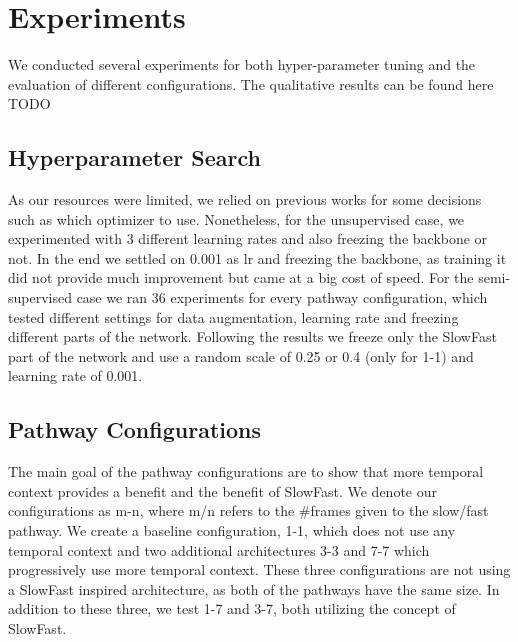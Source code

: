 \section{Experiments}
We conducted several experiments for both hyper-parameter tuning and the evaluation of different configurations.
The qualitative results can be found here TODO

\subsection{Hyperparameter Search}
As our resources were limited, we relied on previous works for some decisions such as which optimizer to use. Nonetheless, for the unsupervised case, we experimented with 3 different learning rates and also freezing the backbone or not. In the end we settled on 0.001 as lr and freezing the backbone, as training it did not provide much improvement but came at a big cost of speed. For the semi-supervised case we ran 36 experiments for every pathway configuration, which tested different settings for data augmentation, learning rate and freezing different parts of the network. Following the results we freeze only the SlowFast part of the network and use a random scale of 0.25 or 0.4 (only for 1-1) and learning rate of 0.001.

\subsection{Pathway Configurations}
The main goal of the pathway configurations are to show that more temporal context provides a benefit and the benefit of SlowFast. We denote our configurations as m-n, where m/n refers to the \#frames given to the slow/fast pathway.
We create a baseline configuration, 1-1, which does not use any temporal context and two additional architectures 3-3 and 7-7 which progressively use more temporal context. These three configurations are not using a SlowFast inspired architecture, as both of the pathways have the same size. In addition to these three, we test 1-7 and 3-7, both utilizing the concept of SlowFast.

